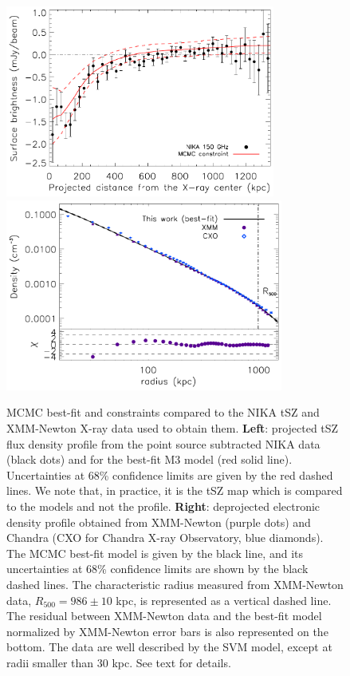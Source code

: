 \documentclass[twocolumn,traditabstract]{aa}
\begin{document}
\begin{figure}[h]
\centering
\includegraphics[height=6.3cm]{Figure/MACSJ1424_profile_ML.pdf}
\includegraphics[height=6.3cm]{Figure/ICM_density_profile.pdf}
\caption{\footnotesize MCMC best-fit and constraints compared to the NIKA tSZ and XMM-Newton X-ray data used to obtain them. {\bf Left}: projected tSZ flux density profile from the point source subtracted NIKA data (black dots) and for the best-fit M3 model (red solid line). Uncertainties at 68\% confidence limits are given by the red dashed lines. We note that, in practice, it is the tSZ map which is compared to the models and not the profile. {\bf Right}: deprojected electronic density profile obtained from XMM-Newton (purple dots) and Chandra (CXO for Chandra X-ray Observatory, blue diamonds). The MCMC best-fit model is given by the black line, and its uncertainties at 68\% confidence limits are shown by the black dashed lines. The characteristic radius measured from XMM-Newton data, $R_{500} = 986 \pm 10$ kpc, is represented as a vertical dashed line. The residual between XMM-Newton data and the best-fit model normalized by XMM-Newton error bars is also represented on the bottom. The data are well described by the SVM model, except at radii smaller than 30 kpc. See text for details.}
\label{fig:MACSJ1424_MCMC_vs_data}
\end{figure}
\end{document}
